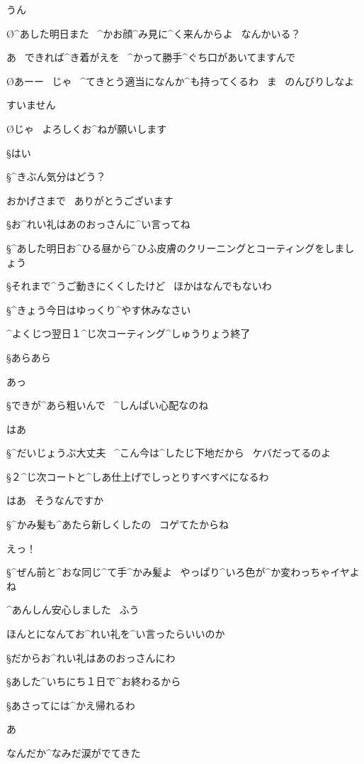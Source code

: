 \A うん

\O ^{あした}{明日}また
\ ^{かお}{顔}^{み}{見}に^{く}{来}んからよ
\ なんかいる？

\A あ
\ できれば^{き}{着}がえを
\ ^{かって}{勝手}^{ぐち}{口}があいてますんで

\O あーー
\ じゃ
\ ^{てきとう}{適当}になんか^{も}{持}ってくるわ
\ ま
\ のんびりしなよ

\A すいません

\O じゃ
\ よろしくお^{ねが}{願}いします

\S はい

\page
\S ^{きぶん}{気分}はどう？

\A おかげさまで
\ ありがとうございます

\S お^{れい}{礼}はあのおっさんに^{い}{言}ってね

\S ^{あした}{明日}お^{ひる}{昼}から^{ひふ}{皮膚}のクリーニングとコーティングをしましょう

\S それまで^{うご}{動}きにくくしたけど
\ ほかはなんでもないわ

\S ^{きょう}{今日}はゆっくり^{やす}{休}みなさい

\page
\N ^{よくじつ}{翌日}１^{じ}{次}コーティング^{しゅうりょう}{終了}

\S あらあら

\A あっ

\S できが^{あら}{粗}いんで
\ ^{しんぱい}{心配}なのね

\A はあ

\S ^{だいじょうぶ}{大丈夫}
\ ^{こん}{今}は^{したじ}{下地}だから
\ ケバだってるのよ

\page
\S ２^{じ}{次}コートと^{しあ}{仕上}げでしっとりすべすべになるわ

\A はあ
\ そうなんですか

\S ^{かみ}{髪}も^{あたら}{新}しくしたの
\ コゲてたからね

\A えっ！

\S ^{ぜん}{前}と^{おな}{同}じ^{て}{手}^{かみ}{髪}よ
\ やっぱり^{いろ}{色}が^{か}{変}わっちゃイヤよね

\A ^{あんしん}{安心}しました
\ ふう

\A ほんとになんてお^{れい}{礼}を^{い}{言}ったらいいのか

\S だからお^{れい}{礼}はあのおっさんにわ

\S あした^{いちにち}{１日}で^{お}{終}わるから

\S あさってには^{かえ}{帰}れるわ

\page
\A あ

\A なんだか^{なみだ}{涙}がでてきた

